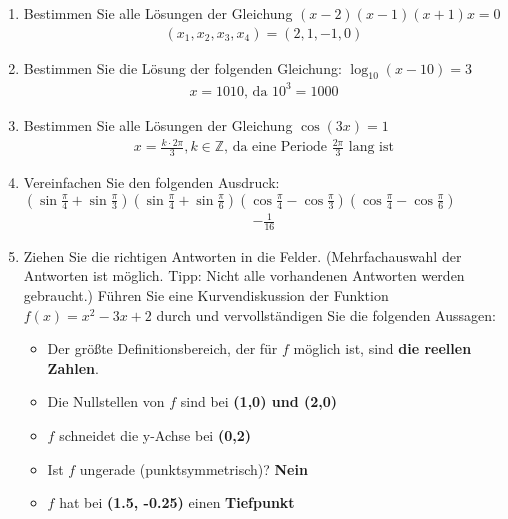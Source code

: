 \documentclass[12pt]{article}
\begin{document}

\noindent
\begin{enumerate}[start=1,label={\bfseries Frage \arabic*:},leftmargin=1in]

    \item Bestimmen Sie alle Lösungen der Gleichung $(x-2)(x-1)(x+1)x=0$
    \begin{align*}
        (x_{1},x_{2},x_{3},x_{4}) = (2,1,-1,0)
    \end{align*}

    \item Bestimmen Sie die Lösung der folgenden Gleichung: $\log_{10}(x-10)=3$
    \begin{align*}
        x = 1010 \text{, da } 10^3 = 1000
    \end{align*}

    \item Bestimmen Sie alle Lösungen der Gleichung $\cos{(3x)}=1$
    \begin{align*}
        x = \frac{k \cdot 2\pi}{3}, k \in \mathbb{Z} \text{, da eine Periode } \frac{2\pi}{3} \text{ lang ist}
    \end{align*}

    \item Vereinfachen Sie den folgenden Ausdruck: \\
          $(\sin{\frac{\pi}{4}} + \sin{\frac{\pi}{3}})(\sin{\frac{\pi}{4}} + \sin{\frac{\pi}{6}})(\cos{\frac{\pi}{4}} - \cos{\frac{\pi}{3}})(\cos{\frac{\pi}{4}} - \cos{\frac{\pi}{6}})$
    \begin{align*}
        -\frac{1}{16}
    \end{align*}

    \item Ziehen Sie die richtigen Antworten in die Felder. (Mehrfachauswahl der \\ 
    Antworten ist möglich. Tipp: Nicht alle vorhandenen Antworten werden gebraucht.) 
    Führen Sie eine Kurvendiskussion der Funktion $f(x)=x^2 - 3x + 2$ durch und vervollständigen Sie die folgenden Aussagen: 
    \begin{itemize}
        \item Der größte Definitionsbereich, der für $f$ möglich ist, sind \textbf{die reellen Zahlen}.
        \item Die Nullstellen von $f$ sind bei \textbf{(1,0) und (2,0)}
        \item $f$ schneidet die y-Achse bei \textbf{(0,2)}
        \item Ist $f$ ungerade (punktsymmetrisch)? \textbf{Nein}
        \item $f$ hat bei \textbf{(1.5, -0.25)} einen \textbf{Tiefpunkt}
    \end{itemize}


\end{enumerate}
\end{document}
